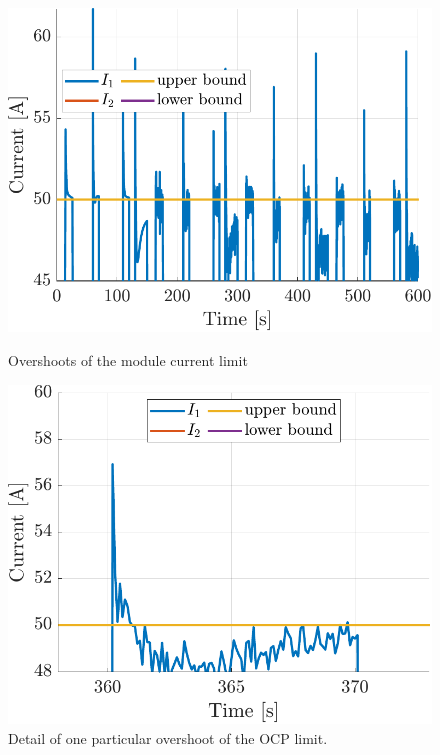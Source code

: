 \begin{figure}
\centering
\begin{minipage}{0.49\textwidth}
    \centering
    \includegraphics[width=\linewidth]{figures/13/fb-subsystem-detail.pdf}
    \caption{Overshoots of the module current limit}
    \label{fig:13-fb-subsystem-detail}
\end{minipage}
\hfill
\begin{minipage}{0.49\textwidth}
    \centering
    \includegraphics[width=\linewidth]{figures/13/fb-subsystem-detail2.pdf}
    \caption{Detail of one particular overshoot of the OCP limit.}
    \label{fig:13-fb-subsystem-detail2}
\end{minipage}
\end{figure}

